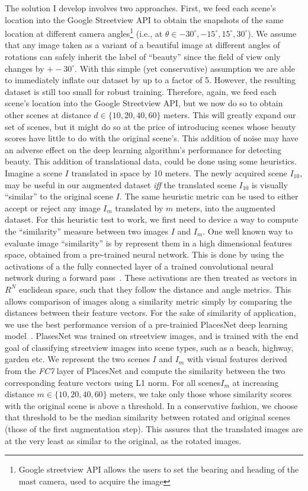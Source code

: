 The solution I develop involves two approaches. First, we feed each scene's location into the Google Streetview API to obtain the snapshots of the same location at different camera angles\footnote{Google streetview API allows the users to set the bearing and heading of the mast camera, used to acquire the image} (i.e., at $\theta \in {-30^{\circ}, -15^{\circ} , 15^{\circ} , 30^{\circ} }$). We assume that any image taken as a variant of a beautiful image at different angles of rotations can safely inherit the label of ``beauty'' since the field of view only changes by $+- 30^\circ $. With this simple (yet conservative) assumption we are able to immediately inflate our dataset by up to a factor of 5.
However, the resulting dataset is still too small for robust training. Therefore, again, we feed each scene's location into the Google Streetview API, but we now do so to obtain other scenes at  distance $d \in \{10,20,40,60\}$ meters.  This will greatly expand our set of scenes, but it might do so at the price of introducing scenes whose beauty scores have little to do with the original scene's. 
This addition of noise may have an adverse effect on the deep learning algorithm's performance for detecting beauty. 
This addition of translational data, could be done using some heuristics. Imagine a scene $I$ translated in space by 10 meters. The newly acquired scene $I_{10}$, may be useful in our augmented dataset \textit{iff} the translated scene $I_{10}$ is visually ``similar'' to the original scene $I$. The same heuristic metric can be used to either accept or reject any image $I_{m}$ translated by $m$ meters, into the augmented dataset. 
For this heuristic test to work, we first need to device a way to compute the ``similarity'' measure between two images $I$ and $I_{m}$. 
One well known way to evaluate image ``similarity'' is by represent them in a high dimensional features space, obtained from a pre-trained neural network. This is done by using the activations of a the fully connected layer of a trained convolutional neural network during a forward pass~\cite{babenko2015aggregating,Lin_2015_CVPR_Workshops,varga2016fast}. These activations are then treated as vectors in $R^N$ euclidean space, such that they follow the distance and angle metrics. This allows comparison of images along a similarity metric simply by comparing the distances between their feature vectors. For the sake of similarity of application, we use the best performance version of a pre-trainied PlacesNet deep learning model~\cite{zhou2014learning}. PlasesNet was trained on streetview images, and is trained with the end goal of classifying streetview images into scene types, such as a beach, highway, garden etc. We represent the two scenes $I$ and $I_m$ with visual features derived from the \textsl{FC7} layer of PlacesNet and compute the similarity between the two corresponding feature vectors using L1 norm. 
For all scenes$I_m$ at increasing distance $m \in \{10,20,40,60\}$ meters,  we take only those whose similarity scores with the original scene is above a threshold. In a conservative fashion, we choose that threshold to be the median similarity between rotated and original scenes (those of the first augmentation step). This assures that the translated images are at the very least as similar to the original, as the rotated images.

